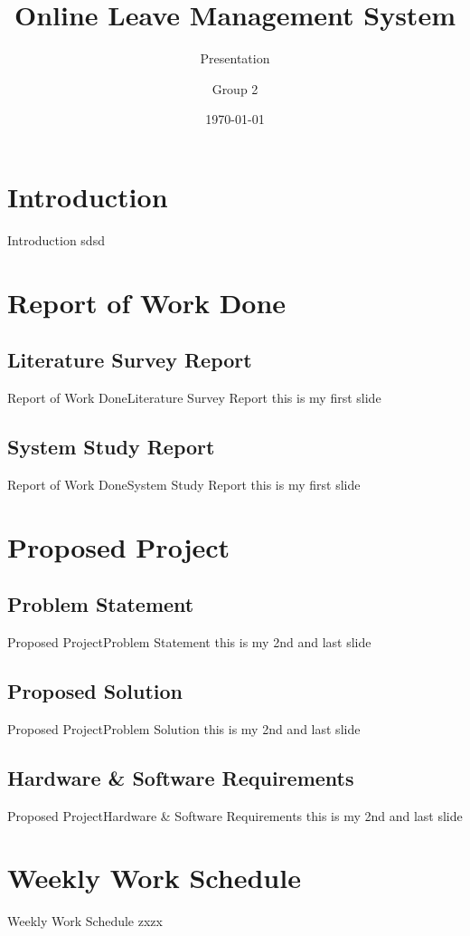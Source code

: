 \documentclass[default]{beamer}
\title[OLM]{Online Leave Management System}
\subtitle{Presentation}
\date{\today}
\author[Group 2]{Group 2}
\institute[MEC]{Govt. Model Engineering College,Thrikakkara}
\begin{document}
		
	\frame{\maketitle}	
	
	\section{Introduction}
		\begin{frame}{Introduction}
		sdsd
		\end{frame}			
	
	
	\section{Report of Work Done}
		\subsection{Literature Survey Report}				
		\begin{frame}{Report of Work Done}{Literature Survey Report}
		this is my first slide
		\end{frame}
		
		\subsection{System Study Report}			
		\begin{frame}{Report of Work Done}{System Study Report}
		this is my first slide
		\end{frame}
	
	\section{Proposed Project}
	\subsection{Problem Statement}				
		\begin{frame}{Proposed Project}{Problem Statement}
		this is my 2nd and last slide
		\end{frame}
		
	\subsection{Proposed Solution}						
		\begin{frame}{Proposed Project}{Problem Solution}
		this is my 2nd and last slide
		\end{frame}
		
	\subsection{Hardware \& Software Requirements}						
		\begin{frame}{Proposed Project}{Hardware \& Software Requirements} 
		this is my 2nd and last slide
		\end{frame}
	
	\section{Weekly Work Schedule}
		\begin{frame}{Weekly Work Schedule}
		zxzx
		\end{frame}			
\end{document}
